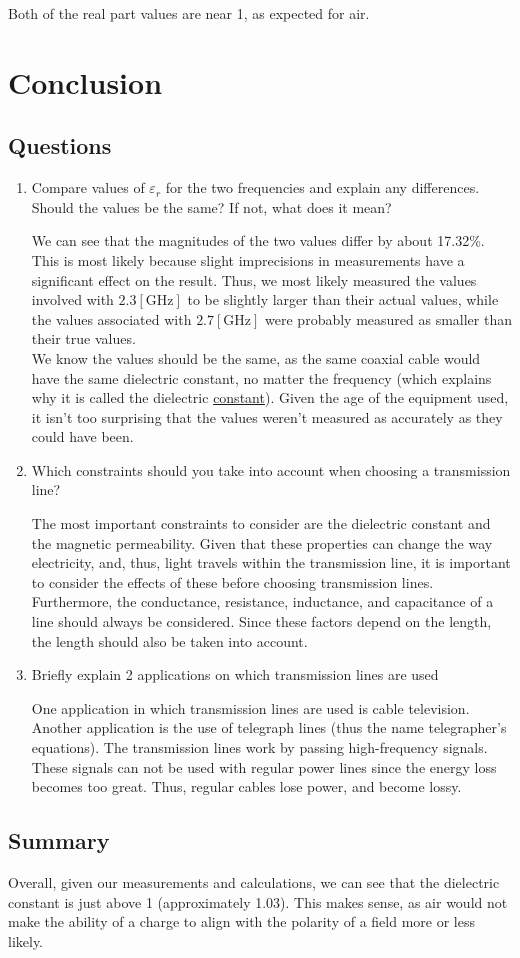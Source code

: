 \documentclass[
	letterpaper, %
	10pt, %
]{CSUniSchoolLabReport}
\begin{document}
Both of the real part values are near 1, as expected for air.

\section{Conclusion}

\subsection{Questions}

\begin{enumerate}

  \item Compare values of $\varepsilon_r$ for the two frequencies and explain any differences. Should the values be the same? If not, what does it mean?

    We can see that the magnitudes of the two values differ by about 17.32\%. This is most likely because slight imprecisions in measurements have a significant effect on the result. Thus, we most likely measured the values involved with $2.3[\si{\giga\hertz}]$ to be slightly larger than their actual values, while the values associated with $2.7[\si{\giga\hertz}]$ were probably measured as smaller than their true values.\\

    We know the values should be the same, as the same coaxial cable would have the same dielectric constant, no matter the frequency (which explains why it is called the dielectric \underline{constant}). Given the age of the equipment used, it isn't too surprising that the values weren't measured as accurately as they could have been. 

  \item Which constraints should you take into account when choosing a transmission line?

    The most important constraints to consider are the dielectric constant and the magnetic permeability. Given that these properties can change the way electricity, and, thus, light travels within the transmission line, it is important to consider the effects of these before choosing transmission lines. Furthermore, the conductance, resistance, inductance, and capacitance of a line should always be considered. Since these factors depend on the length, the length should also be taken into account.

  \item Briefly explain 2 applications on which transmission lines are used

    One application in which transmission lines are used is cable television. Another application is the use of telegraph lines (thus the name telegrapher's equations). The transmission lines work by passing high-frequency signals. These signals can not be used with regular power lines since the energy loss becomes too great. Thus, regular cables lose power, and become lossy.

\end{enumerate}

\subsection{Summary}

Overall, given our measurements and calculations, we can see that the dielectric constant is just above 1 (approximately 1.03). This makes sense, as air would not make the ability of a charge to align with the polarity of a field more or less likely.
\end{document}
